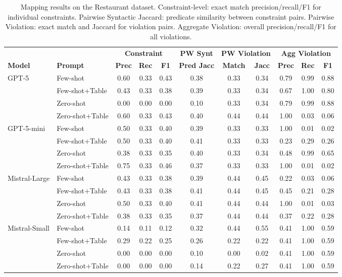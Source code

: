 \begin{table}[htbp]
\centering
\small
\caption{Mapping results on the Restaurant dataset. Constraint-level: exact match precision/recall/F1 for individual constraints. Pairwise Syntactic Jaccard: predicate similarity between constraint pairs. Pairwise Violation: exact match and Jaccard for violation pairs. Aggregate Violation: overall precision/recall/F1 for all violations.}
\label{tab:mapping_results_restaurant}
\begin{tabular}{@{}llccccccccc@{}}
\toprule
 & & \multicolumn{3}{c}{\textbf{Constraint}} & \textbf{PW Synt} & \multicolumn{2}{c}{\textbf{PW Violation}} & \multicolumn{3}{c}{\textbf{Agg Violation}} \\
\cmidrule(lr){3-5} \cmidrule(lr){6-6} \cmidrule(lr){7-8} \cmidrule(lr){9-11}
\textbf{Model} & \textbf{Prompt} & \textbf{Prec} & \textbf{Rec} & \textbf{F1} & \textbf{Pred Jacc} & \textbf{Match} & \textbf{Jacc} & \textbf{Prec} & \textbf{Rec} & \textbf{F1} \\
\midrule
\multirow{4}{*}{GPT-5} & Few-shot & 0.60 & 0.33 & 0.43 & 0.38 & 0.33 & 0.34 & 0.79 & 0.99 & 0.88 \\
 & Few-shot+Table & 0.43 & 0.33 & 0.38 & 0.39 & 0.33 & 0.34 & 0.67 & 1.00 & 0.80 \\
 & Zero-shot & 0.00 & 0.00 & 0.00 & 0.10 & 0.33 & 0.34 & 0.79 & 0.99 & 0.88 \\
 & Zero-shot+Table & 0.60 & 0.33 & 0.43 & 0.40 & 0.44 & 0.44 & 1.00 & 0.03 & 0.06 \\
\cmidrule(lr){1-11}
\multirow{4}{*}{GPT-5-mini} & Few-shot & 0.50 & 0.33 & 0.40 & 0.39 & 0.33 & 0.33 & 1.00 & 0.01 & 0.02 \\
 & Few-shot+Table & 0.50 & 0.33 & 0.40 & 0.41 & 0.33 & 0.33 & 0.23 & 0.29 & 0.26 \\
 & Zero-shot & 0.38 & 0.33 & 0.35 & 0.40 & 0.33 & 0.34 & 0.48 & 0.99 & 0.65 \\
 & Zero-shot+Table & 0.75 & 0.33 & 0.46 & 0.37 & 0.33 & 0.33 & 1.00 & 0.01 & 0.02 \\
\cmidrule(lr){1-11}
\multirow{4}{*}{Mistral-Large} & Few-shot & 0.43 & 0.33 & 0.38 & 0.39 & 0.44 & 0.45 & 0.22 & 0.03 & 0.06 \\
 & Few-shot+Table & 0.43 & 0.33 & 0.38 & 0.41 & 0.44 & 0.45 & 0.45 & 0.21 & 0.28 \\
 & Zero-shot & 0.50 & 0.33 & 0.40 & 0.41 & 0.44 & 0.44 & 1.00 & 0.01 & 0.03 \\
 & Zero-shot+Table & 0.38 & 0.33 & 0.35 & 0.37 & 0.44 & 0.44 & 0.37 & 0.22 & 0.28 \\
\cmidrule(lr){1-11}
\multirow{4}{*}{Mistral-Small} & Few-shot & 0.14 & 0.11 & 0.12 & 0.32 & 0.44 & 0.55 & 0.41 & 1.00 & 0.59 \\
 & Few-shot+Table & 0.29 & 0.22 & 0.25 & 0.26 & 0.22 & 0.22 & 0.41 & 1.00 & 0.59 \\
 & Zero-shot & 0.00 & 0.00 & 0.00 & 0.10 & 0.00 & 0.02 & 0.41 & 1.00 & 0.59 \\
 & Zero-shot+Table & 0.00 & 0.00 & 0.00 & 0.14 & 0.22 & 0.27 & 0.41 & 1.00 & 0.59 \\
\bottomrule
\end{tabular}
\end{table}